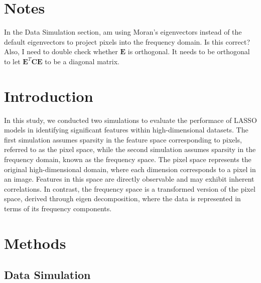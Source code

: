 \documentclass[12pt]{article}
\title{}
\author{Siyang Ren}
\begin{document}
\maketitle

\section*{Notes}

In the Data Simulation section, am using Moran's eigenvectors instead of the default eigenvectors to project pixels into the frequency domain. Is this correct? Also, I need to double check whether \( \mathbf{E} \) is orthogonal. It needs to be orthogonal to let \( \mathbf{E}^T \mathbf{C} \mathbf{E} \) to be a diagonal matrix.

\section*{Introduction}

In this study, we conducted two simulations to evaluate the performace of LASSO models in identifying significant features within high-dimensional datasets. The first simulation assumes sparsity in the feature space corresponding to pixels, referred to as the pixel space, while the second simulation assumes sparsity in the frequency domain, known as the frequency space. The pixel space represents the original high-dimensional domain, where each dimension corresponds to a pixel in an image. Features in this space are directly observable and may exhibit inherent correlations. In contrast, the frequency space is a transformed version of the pixel space, derived through eigen decomposition, where the data is represented in terms of its frequency components.


\section*{Methods}

\subsection*{Data Simulation}
\end{document}
